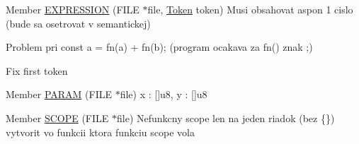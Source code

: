 
\begin{DoxyRefList}
\item[Member \mbox{\hyperlink{syntactic__analysis_8h_a38b7a13b9a5926c2c4b6af62cec86f85}{EXPRESSION}} (FILE $\ast$file, \mbox{\hyperlink{structToken}{Token}} token)]\label{todo__todo000003}%
%
Musi obsahovat aspon 1 cislo (bude sa osetrovat v semantickej) 

Problem pri const a = fn(a) + fn(b); (program ocakava za fn() znak \textquotesingle{};\textquotesingle{}) 

Fix first token  
\item[Member \mbox{\hyperlink{syntactic__analysis_8h_acb21f12318c9d312a452616eb6c7262d}{PARAM}} (FILE $\ast$file)]\label{todo__todo000002}%
%
x \+: \mbox{[}\mbox{]}u8, y \+: \mbox{[}\mbox{]}u8  
\item[Member \mbox{\hyperlink{syntactic__analysis_8h_a7d21e9db61747d6734d9a7f27d33b4f4}{SCOPE}} (FILE $\ast$file)]\label{todo__todo000001}%
%
Nefunkcny scope len na jeden riadok (bez \{\}) vytvorit vo funkcii ktora funkciu scope vola 
\end{DoxyRefList}